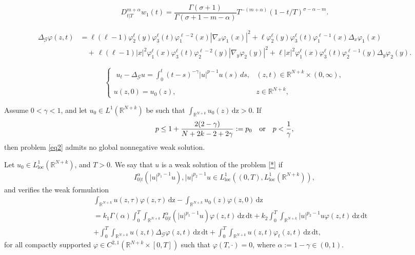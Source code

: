 \documentclass[10pt,a4paper]{amsart}
\def\R{{\mathbb {R}}}
\newcommand{\abs}[1]{\lvert#1\rvert}
\begin{document}
	\begin{equation}\label{Int6}
		D_{t|T}^{m+\alpha}w_1(t)=\frac{\Gamma(\sigma+1)}{\Gamma(\sigma+1-m-\alpha)}T^{-(m+\alpha)}(1-t/T)^{\sigma-\alpha-m}.
	\end{equation}

	\begin{align}\label{IneqA}
		\Delta_{\mathcal{G}}\varphi(z,t) &=\ell(\ell-1)\varphi^\ell_2(y)\varphi^\ell_3(t)\varphi^{\ell-2}_1(x)|\nabla_x\varphi_1(x)|^2+\ell\varphi^\ell_2(y)\varphi^\ell_3(t)\varphi^{\ell-1}_1(x)\Delta_x\varphi_1(x) \\
		&{}\quad +\,\ell(\ell-1)|x|^2\varphi^\ell_1(x)\varphi^\ell_3(t)\varphi^{\ell-2}_2(y)|\nabla_y\varphi_2(y)|^2+\ell|x|^2\varphi^\ell_1(x)\varphi^\ell_3(t)\varphi^{\ell-1}_2(y)\Delta_y\varphi_2(y) .\nonumber
	\end{align}

\begin{equation}\label{eq2}
	\left\{\begin{array}{ll}
		\,\, \displaystyle {u_{t}-\Delta_{\mathcal{G}}
			u =\int_0^t(t-s)^{-\gamma}\abs{u}^{p-1}u(s)\,ds,} &\displaystyle {(z,t)\in {\mathbb{R}}^{N+k}\times (0,\infty),}\\
		{}\\
		\displaystyle{u(z,0)=  u_0(z),\qquad\qquad}&\displaystyle{z\in {\mathbb{R}}^{N+k},}
	\end{array}
	\right.
\end{equation} 

\begin{theorem}\label{T2} Assume $0< \gamma<1$, and let $u_0\in L^1(\R^{N+k})$ be such that $\displaystyle \int_{\R^{N+k}}u_0(z)\,\mathrm{dz}>0$. If
	$$p\leq1+\frac{2(2-\gamma)}{N+2k-2+2\gamma}:=p_0\quad\hbox{or}\quad
	p<\frac{1}{\gamma},$$
	then problem \eqref{eq2} admits no global nonnegative weak solution.
\end{theorem}

\begin{definition}
	Let $u_0\in L_{\mathrm{loc}}^1(\R^{N+k})$, and $T>0$. We say that $u$ is a
	weak solution of the problem \eqref{*} if 
	$$I^\alpha_{0|t}(|u|^{p_1-1}u), |u|^{p_2-1}u \in L_{\mathrm{loc}}^1((0,T),L_{\mathrm{loc}}^1(\R^{N+k})) , $$
	and verifies the weak formulation
	\begin{eqnarray}\label{weaksolution}
		&&\int_{\R^{N+k}}u(z,\tau)\varphi(z,\tau)\,\mathrm{dz}-\int_{\R^{N+k}}u_0(z)\varphi(z,0)\,\mathrm{dz}\nonumber\\
		&&=k_1\Gamma(\alpha)\int_0^T\int_{\R^{N+k}}I^\alpha_{0|t}(|u|^{p_1-1}u)\varphi(z,t)\,\mathrm{dz}\,\mathrm{dt}+k_2\int_0^T\int_{\R^{N+k}}|u|^{p_2-1}u\varphi(z,t)\,\mathrm{dz}\,\mathrm{dt}\nonumber\\
		&&+\int_0^T\int_{\R^{N+k}}u(z,t)\Delta_{\mathcal{G}}\varphi(z,t)\,\mathrm{dz}\,\mathrm{dt}+\int_0^T\int_{\R^{N+k}}u(z,t)\varphi_t(z,t)\,\mathrm{dz}\,\mathrm{dt},
	\end{eqnarray}
	for all compactly supported $\varphi\in C^{2,1}(\R^{N+k}\times[0,T])$ such that $\varphi(T,\cdotp)=0$, where $\alpha:=1-\gamma\in(0,1)$.
\end{definition}
\end{document}
